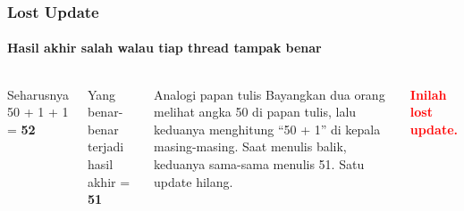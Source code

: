 \documentclass[t,aspectratio=169,xcolor=dvipsnames]{beamer}
\newcommand{\tem}[1]{\textbf{\textcolor{red}{#1}}}
\begin{document}
\begin{frame}
    \frametitle{Lost Update}
    \framesubtitle{Hasil akhir salah walau tiap thread tampak benar}
    \small

    \begin{columns}[T]
        \begin{alertblock}{Seharusnya}
            \centering
            \Large 50 + 1 + 1 = \textbf{52}
        \end{alertblock}

        \vspace{0.2cm}
        \begin{block}{Yang benar-benar terjadi}
            \centering
            \Large hasil akhir = \textbf{51}
        \end{block}

        \begin{exampleblock}{Analogi papan tulis}
            Bayangkan dua orang melihat angka 50 di papan tulis, lalu keduanya menghitung ``50 + 1'' di kepala masing-masing. Saat menulis balik, keduanya sama-sama menulis 51. Satu update hilang.
        \end{exampleblock}

        \vspace{0.15cm}
        \centering
        \Large\tem{Inilah lost update.}
    \end{columns}
\end{frame}
\end{document}

